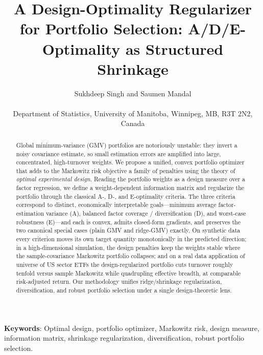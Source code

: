 \documentclass[11pt]{article}
\title{\bfseries A Design-Optimality Regularizer for Portfolio Selection:
  A/D/E-Optimality as Structured Shrinkage}
\author{Sukhdeep Singh and Saumen Mandal \\ \\
Department of Statistics, University of Manitoba, Winnipeg, MB, R3T 2N2, Canada}
\date{}
\begin{document}
\maketitle

\begin{abstract}
Global minimum-variance (GMV) portfolios are notoriously unstable: they invert a
noisy covariance estimate, so small estimation errors are amplified into large,
concentrated, high-turnover weights. We propose a unified, convex portfolio
optimizer that adds to the Markowitz risk objective a family of penalties
using the theory of \emph{optimal experimental design}. Reading the portfolio weights
as a design measure over a factor regression, we define a weight-dependent
information matrix
and regularize the portfolio through the
classical A-, D-, and E-optimality criteria. The three criteria
correspond to distinct, economically interpretable goals---minimum average
factor-estimation variance (A), balanced factor coverage / diversification (D),
and worst-case robustness (E)---and each is convex, admits closed-form
gradients, and preserves the two canonical special cases (plain GMV and
ridge-GMV) exactly. On synthetic data every criterion moves its own target
quantity monotonically in the predicted direction; in a high-dimensional simulation,
the design penalties keep the weights stable where the
sample-covariance Markowitz portfolio collapses; and on a real data application of universe of US
sector ETFs the design-regularized portfolio cuts turnover roughly tenfold
versus sample Markowitz while quadrupling effective breadth, at comparable
risk-adjusted return. Our methodology unifies ridge/shrinkage regularization,
diversification, and robust portfolio selection under a single design-theoretic
lens.
\end{abstract}

\vspace{0.2cm}

{\bf Keywords}:
Optimal design, portfolio optimizer, Markowitz risk, design measure, information matrix, shrinkage regularization, diversification, robust portfolio selection.

\end{document}
